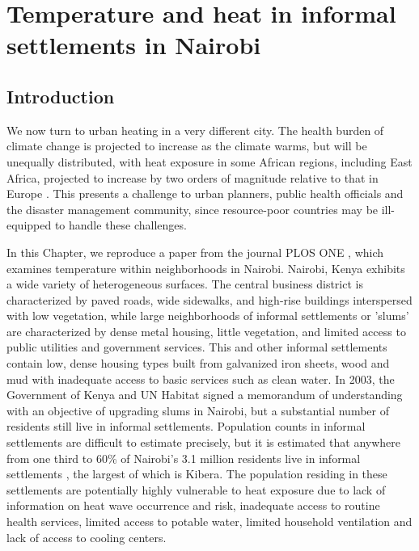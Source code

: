 \chapter{Temperature and heat in informal settlements in Nairobi}
\label{chap:nairobi}

\section{Introduction}

We now turn to urban heating in a very different city.
The health burden of climate change is projected to increase as the climate warms, but will be unequally distributed, with heat exposure in some African regions, including East Africa, projected to increase by two orders of magnitude relative to that in Europe \citep{liu2017global}. 
This presents a challenge to urban planners, public health officials and the disaster management community, since resource-poor countries may be ill-equipped to handle these challenges. 

In this Chapter, we reproduce a paper from the journal PLOS ONE \cite{scott2017temperature}, which examines temperature within neighborhoods in Nairobi.  
Nairobi, Kenya exhibits a wide variety of heterogeneous surfaces. The central business district is characterized by paved roads, wide sidewalks, and high-rise buildings interspersed with low vegetation, while large neighborhoods of informal settlements or 'slums' are characterized by dense metal housing, little vegetation, and limited access to public utilities and government services. This and other informal settlements contain low, dense housing types built from galvanized iron sheets, wood and mud with inadequate access to basic services such as clean water. 
In 2003, the Government of Kenya and UN Habitat signed a memorandum of understanding with an objective of upgrading slums in Nairobi, but a substantial number of residents still live in informal settlements. 
Population counts in informal settlements are difficult to estimate precisely, but it is estimated that anywhere from one third to 60\% of Nairobi's 3.1 million residents live in informal settlements \citep{kenyacensus, ncss2012}, the largest of which is Kibera.
The population residing in these settlements are potentially highly vulnerable to heat exposure due to
lack of information on heat wave occurrence and risk, inadequate access to routine health services, limited access to potable water, limited household ventilation and lack of access to cooling centers.

